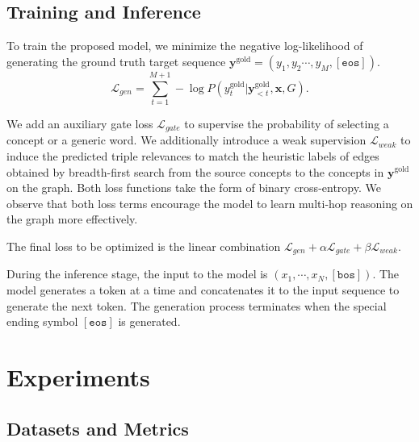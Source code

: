 \documentclass[11pt,a4paper]{article}
\begin{document}
\subsection{Training and Inference}
To train the proposed model, we minimize the negative log-likelihood of generating the ground truth target sequence $\bm{y}^{\text{gold}}=(y_1,y_2\cdots, y_M,[\texttt{eos}])$.
\begin{equation}
    \mathcal{L}_{gen} = \sum_{t=1}^{M+1} -\log P(y^{\text{gold}}_t|\bm{y}^{\text{gold}}_{<t},\bm{x}, G).
\end{equation}

We add an auxiliary gate loss $\mathcal{L}_{gate}$ to supervise the probability of selecting a concept or a generic word. We additionally introduce a weak supervision $\mathcal{L}_{weak}$ to induce the predicted triple relevances to match the heuristic labels of edges obtained by breadth-first search from the source concepts to the concepts in $\bm{y}^{\text{gold}}$ on the graph. %
Both loss functions take the form of binary cross-entropy. We observe that both loss terms encourage the model to learn multi-hop reasoning on the graph more effectively.



The final loss to be optimized is the linear combination $\mathcal{L}_{gen} + \alpha \mathcal{L}_{gate} + \beta \mathcal{L}_{weak}$.

During the inference stage, the input to the model is $(x_1,\cdots,x_N,[\texttt{bos}])$. The model generates a token at a time and concatenates it to the input sequence to generate the next token. The generation process terminates when the special ending symbol $[\texttt{eos}]$ is generated.

\section{Experiments}

\subsection{Datasets and Metrics}
\end{document}
